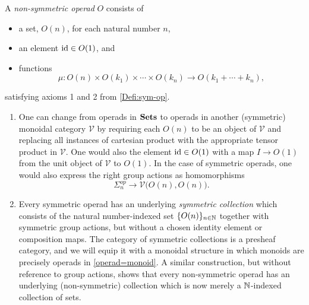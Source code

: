 \begin{Defi}\label{Defi:non-sym-op}
A \emph{non-symmetric operad} $O$ consists of 
\begin{itemize}
\item a set, $O(n)$, for each natural number $n$,
\item an element $\textrm{id} \in O(1)$, and
\item functions
  \[
    \mu \colon  O(n) \times O(k_{1}) \times \cdots \times O(k_{n}) \rightarrow O(k_{1} + \cdots + k_{n}),
  \]
\end{itemize}
satisfying axioms 1 and 2 from \cref{Defi:sym-op}.
\end{Defi}

\begin{rem}\label{rem:V-and-coll}
\begin{enumerate}
\item One can change from operads in $\mathbf{Sets}$ to operads in another (symmetric) monoidal category $\mathcal{V}$ by requiring each $O(n)$ to be an object of $\mathcal{V}$ and replacing all instances of cartesian product with the appropriate tensor product in $\mathcal{V}$. One would also the element $\textrm{id} \in O(1)$ with a map $I \rightarrow O(1)$ from the unit object of $\mathcal{V}$ to $O(1)$. In the case of symmetric operads, one would also express the right group actions as homomorphisms
\[
\Sigma_n^{op} \to \mathcal{V}\big( O(n), O(n) \big).
\]
\item Every symmetric operad has an underlying \textit{symmetric collection} which consists of the natural number-indexed set $\{ O(n) \}_{n \in \mathbb{N}}$ together with symmetric group actions, but without a chosen identity element or composition maps. The category of symmetric collections is a presheaf category, and we will equip it with a monoidal structure in which monoids are precisely operads in \cref{operad=monoid}. A similar construction, but without reference to group actions, shows that every non-symmetric operad has an underlying (non-symmetric) collection which is now merely a $\mathbb{N}$-indexed collection of sets.
\end{enumerate}
\end{rem}

